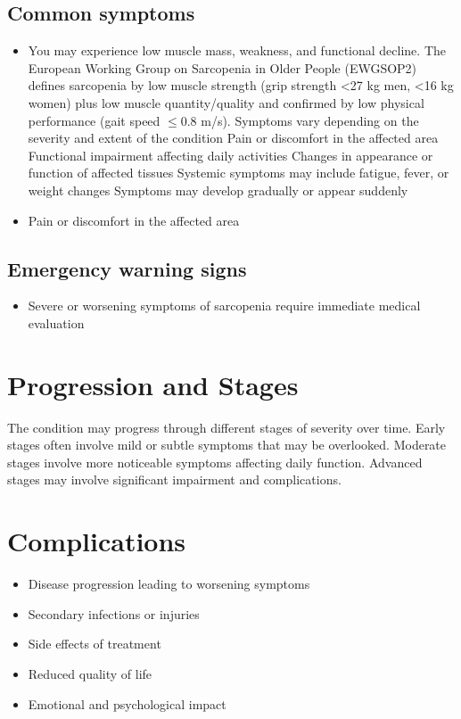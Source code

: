 \subsection{Common symptoms}
\begin{itemize}[noitemsep]
  \item You may experience low muscle mass, weakness, and functional decline. The European Working Group on Sarcopenia in Older People (EWGSOP2) defines sarcopenia by low muscle strength (grip strength <27 kg men, <16 kg women) plus low muscle quantity/quality and confirmed by low physical performance (gait speed $\leq$0.8 m/s). Symptoms vary depending on the severity and extent of the condition Pain or discomfort in the affected area Functional impairment affecting daily activities Changes in appearance or function of affected tissues Systemic symptoms may include fatigue, fever, or weight changes Symptoms may develop gradually or appear suddenly
  \item Pain or discomfort in the affected area
  \end{itemize}

\subsection{Emergency warning signs}
\begin{itemize}[noitemsep]
  \item Severe or worsening symptoms of sarcopenia require immediate medical evaluation
\end{itemize}
\section{Progression and Stages}
The condition may progress through different stages of severity over time. Early stages often involve mild or subtle symptoms that may be overlooked. Moderate stages involve more noticeable symptoms affecting daily function. Advanced stages may involve significant impairment and complications.
\section{Complications}
\begin{itemize}[noitemsep]
  \item Disease progression leading to worsening symptoms
  \item Secondary infections or injuries
  \item Side effects of treatment
  \item Reduced quality of life
  \item Emotional and psychological impact
\end{itemize}
